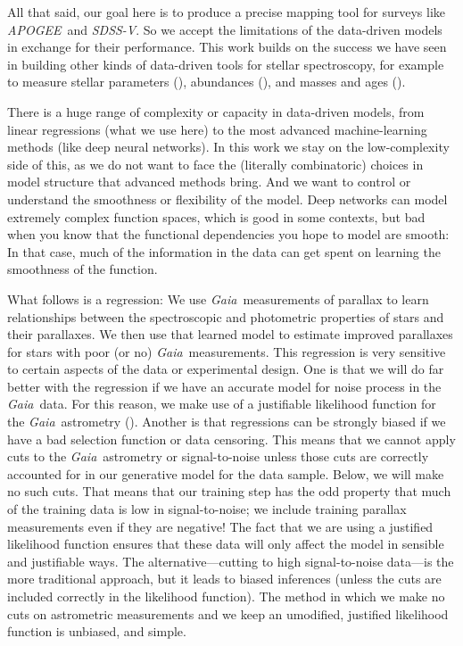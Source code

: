 \documentclass[modern]{aastex62}
\newcommand{\acronym}[1]{{\small{#1}}}
\newcommand{\project}[1]{\textsl{#1}}
\newcommand{\apogee}{\project{\acronym{APOGEE}}}
\newcommand{\gaia}{\project{Gaia}}
\newcommand{\sdssv}{\project{\acronym{SDSS-V}}}
\begin{document}
All that said, our goal here is to produce a precise mapping tool for surveys
like \apogee\ and \sdssv.
So we accept the limitations of the data-driven models in exchange for their
performance.
This work builds on the success we have seen in building other kinds of
data-driven tools for  stellar spectroscopy, for example to measure stellar
parameters (\citealt{cannon}), abundances (\citealt{ho, casey, nessdopp}),
and masses and ages (\citealt{nessage}).

There is a huge range of complexity or capacity in data-driven
models, from linear regressions (what we use here) to the most advanced machine-learning
methods (like deep neural networks).
In this work we stay on the low-complexity side of this, as
we do not want to face the (literally combinatoric) choices in model structure that
advanced methods bring.
And we want to control or understand the smoothness or flexibility of the model.
Deep networks can model extremely complex function spaces, which is good in some
contexts, but bad when you know that the functional dependencies you hope to
model are smooth:
In that case, much of the information in the data can get spent on learning the
smoothness of the function.

What follows is a regression:
We use \gaia\ measurements of parallax to learn relationships between 
the spectroscopic and photometric properties of stars and their parallaxes.
We then use that learned model to estimate improved parallaxes for stars with
poor (or no) \gaia\ measurements.
This regression is very sensitive to certain aspects of the data or experimental
design.
One is that we will do far better with the regression if we have an accurate
model for noise process in the \gaia\ data.
For this reason, we make use of a justifiable likelihood function for the
\gaia\ astrometry (\citealt{gaialf}).
Another is that regressions can be strongly biased if we have a bad selection function
or data censoring.
This means that we cannot apply cuts to the \gaia\ astrometry or signal-to-noise
unless those cuts are correctly accounted for in our generative model for the
data sample.
Below, we will make no such cuts. That means that our training step has the odd
property that much of the training data is low in signal-to-noise; we include
training parallax measurements even if they are negative!
The fact that we are using a justified likelihood function ensures that these
data will only affect the model in sensible and justifiable ways.
The alternative---cutting to high signal-to-noise data---is the more traditional
approach, but it leads to biased inferences (unless the cuts are included correctly
in the likelihood function).
The method in which we make no cuts on astrometric measurements
and we keep an umodified, justified likelihood function
is unbiased, and simple.
\end{document}
